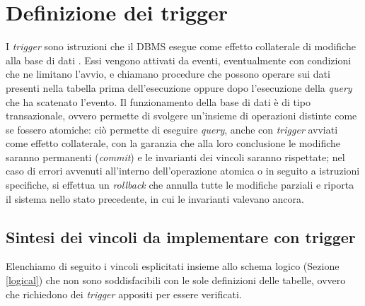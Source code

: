\FloatBarrier

\section{Definizione dei trigger}
\label{physicaltriggers}

I \emph{trigger} sono istruzioni che il DBMS esegue come effetto collaterale di modifiche alla base di dati \cite{Sil11}.
Essi vengono attivati da eventi, eventualmente con condizioni che ne limitano l'avvio, e chiamano procedure che possono operare sui dati presenti nella tabella prima dell'esecuzione oppure dopo l'esecuzione della \emph{query} che ha scatenato l'evento.
Il funzionamento della base di dati è di tipo transazionale, ovvero permette di svolgere un'insieme di operazioni distinte come se fossero atomiche: ciò permette di eseguire \emph{query}, anche con \emph{trigger} avviati come effetto collaterale, con la garanzia che alla loro conclusione le modifiche saranno permanenti (\emph{commit}) e le invarianti dei vincoli saranno rispettate; nel caso di errori avvenuti all'interno dell'operazione atomica o in seguito a istruzioni specifiche, si effettua un \emph{rollback} che annulla tutte le modifiche parziali e riporta il sistema nello stato precedente, in cui le invarianti valevano ancora.

\subsection{Sintesi dei vincoli da implementare con trigger}
\label{physicaltriggerssynthesis}

Elenchiamo di seguito i vincoli esplicitati insieme allo schema logico (Sezione \ref{logical}) che non sono soddisfacibili con le sole definizioni delle tabelle, ovvero che richiedono dei \emph{trigger} appositi per essere verificati.

